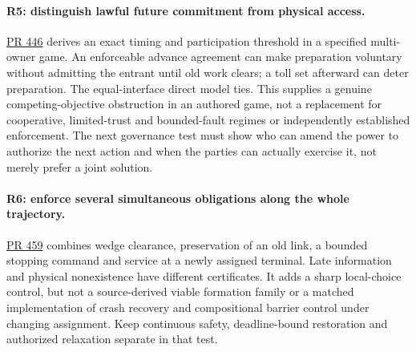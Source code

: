 \documentclass[11pt]{article}
\newcommand{\pr}[1]{\href{https://github.com/eternal-november/eos-research-programmes/pull/#1}{PR #1}}
\begin{document}
\paragraph{R5: distinguish lawful future commitment from physical access.}
\pr{446} derives an exact timing and participation threshold in a specified multi-owner game. An enforceable advance agreement can make preparation voluntary without admitting the entrant until old work clears; a toll set afterward can deter preparation. The equal-interface direct model ties. This supplies a genuine competing-objective obstruction in an authored game, not a replacement for cooperative, limited-trust and bounded-fault regimes or independently established enforcement. The next governance test must show who can amend the power to authorize the next action and when the parties can actually exercise it, not merely prefer a joint solution.

\paragraph{R6: enforce several simultaneous obligations along the whole trajectory.}
\pr{459} combines wedge clearance, preservation of an old link, a bounded stopping command and service at a newly assigned terminal. Late information and physical nonexistence have different certificates. It adds a sharp local-choice control, but not a source-derived viable formation family or a matched implementation of crash recovery and compositional barrier control under changing assignment. Keep continuous safety, deadline-bound restoration and authorized relaxation separate in that test.
\end{document}
